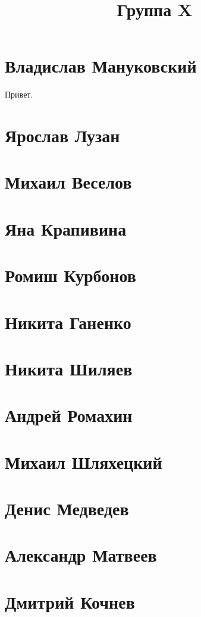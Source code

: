 \documentclass{article}
\title{Группа X}
\begin{document}
\section*{Владислав Мануковский}
Привет.
\section*{Ярослав Лузан}

\section*{Михаил Веселов}

\section*{Яна Крапивина}

\section*{Ромиш Курбонов}

\section*{Никита Ганенко}

\section*{Никита Шиляев}

\section*{Андрей Ромахин}

\section*{Михаил Шляхецкий}

\section*{Денис Медведев}

\section*{Александр Матвеев}

\section*{Дмитрий Кочнев}
\end{document}
